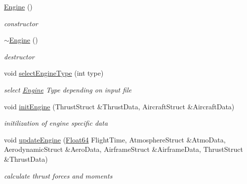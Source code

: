 \begin{DoxyCompactItemize}
\item 
\mbox{\label{group___engine_a8c98683b0a3aa28d8ab72a8bcd0d52f2}} 
\hyperlink{group___engine_a8c98683b0a3aa28d8ab72a8bcd0d52f2}{Engine} ()
\begin{DoxyCompactList}\small\item\em constructor \end{DoxyCompactList}\item 
\mbox{\label{group___engine_a8ef7030a089ecb30bbfcb9e43094717a}} 
\hyperlink{group___engine_a8ef7030a089ecb30bbfcb9e43094717a}{$\sim$\+Engine} ()
\begin{DoxyCompactList}\small\item\em destructor \end{DoxyCompactList}\item 
void \hyperlink{group___engine_ac33371d6fff86c0c8e14495f10046d9a}{select\+Engine\+Type} (int type)
\begin{DoxyCompactList}\small\item\em select \hyperlink{group___engine_class_engine}{Engine} Type depending on input file \end{DoxyCompactList}\item 
\mbox{\label{group___engine_aee607dba02101af5b299920f89b56e79}} 
void \hyperlink{group___engine_aee607dba02101af5b299920f89b56e79}{init\+Engine} (Thrust\+Struct \&Thrust\+Data, Aircraft\+Struct \&Aircraft\+Data)
\begin{DoxyCompactList}\small\item\em initilization of engine specific data \end{DoxyCompactList}\item 
void \hyperlink{group___engine_a9e16100ffd33cf8ec632257795c03865}{update\+Engine} (\hyperlink{group___tools_ga3f1431cb9f76da10f59246d1d743dc2c}{Float64} Flight\+Time, Atmosphere\+Struct \&Atmo\+Data, Aerodynamic\+Struct \&Aero\+Data, Airframe\+Struct \&Airframe\+Data, Thrust\+Struct \&Thrust\+Data)
\begin{DoxyCompactList}\small\item\em calculate thrust forces and moments \end{DoxyCompactList}\end{DoxyCompactItemize}


